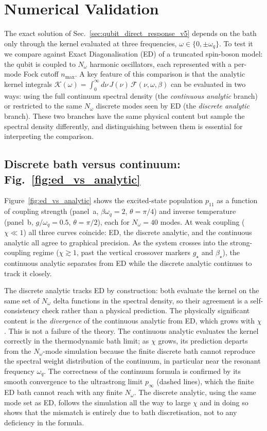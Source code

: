 \section{Numerical Validation}
\label{sec:numerical_results}

The exact solution of Sec.~\ref{sec:qubit_direct_response_v5} depends on the
bath only through the kernel evaluated at three frequencies,
$\omega \in \{0, \pm\omega_q\}$.
To test it we compare against Exact Diagonalisation (ED) of a truncated
spin-boson model: the qubit is coupled to $N_\omega$ harmonic oscillators,
each represented with a per-mode Fock cutoff $n_{\max}$.
A key feature of this comparison is that the analytic kernel integrals
$\mathcal{K}(\omega) = \int_0^\infty d\nu\, J(\nu)\, \mathcal{F}(\nu,\omega,\beta)$
can be evaluated in two ways: using the full continuum spectral density
(the \emph{continuous analytic} branch) or restricted to the same $N_\omega$
discrete modes seen by ED (the \emph{discrete analytic} branch).
These two branches have the same physical content but sample the spectral
density differently, and distinguishing between them is essential for
interpreting the comparison.

\subsection*{Discrete bath versus continuum: Fig.~\protect\ref{fig:ed_vs_analytic}}

Figure~\ref{fig:ed_vs_analytic} shows the excited-state population $p_{11}$
as a function of coupling strength (panel~a, $\beta\omega_q = 2$,
$\theta = \pi/4$) and inverse temperature (panel~b, $g/\omega_q = 0.5$,
$\theta = \pi/2$), each for $N_\omega = 40$ modes.
At weak coupling ($\chi \ll 1$) all three curves coincide: ED, the discrete
analytic, and the continuous analytic all agree to graphical precision.
As the system crosses into the strong-coupling regime ($\chi \gtrsim 1$,
past the vertical crossover markers $g_\star$ and $\beta_\star$), the
continuous analytic separates from ED while the discrete analytic continues
to track it closely.

The discrete analytic tracks ED by construction: both evaluate the kernel
on the same set of $N_\omega$ delta functions in the spectral density, so
their agreement is a self-consistency check rather than a physical
prediction.
The physically significant content is the \emph{divergence} of the
continuous analytic from ED, which grows with $\chi$.
This is not a failure of the theory.
The continuous analytic evaluates the kernel correctly in the thermodynamic
bath limit; as $\chi$ grows, its prediction departs from the $N_\omega$-mode
simulation because the finite discrete bath cannot reproduce the spectral
weight distribution of the continuum, in particular near the resonant
frequency $\omega_q$.
The correctness of the continuum formula is confirmed by its smooth
convergence to the ultrastrong limit $p_\infty$ (dashed lines), which
the finite ED bath cannot reach with any finite $N_\omega$.
The discrete analytic, using the same mode set as ED, follows the simulation
all the way to large $\chi$ and in doing so shows that the mismatch is
entirely due to bath discretisation, not to any deficiency in the formula.

